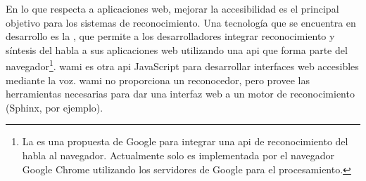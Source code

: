 En lo que respecta a aplicaciones web, mejorar la accesibilidad es el principal objetivo para los sistemas
de reconocimiento. Una tecnolog\'ia que se encuentra en desarrollo es la  \cite{GoogleWebSpeechAPI}, 
que permite a los desarrolladores integrar reconocimiento y s\'intesis del habla a sus aplicaciones web utilizando
una \gls{api} que forma parte del navegador\footnote{La  es una propuesta de Google para integrar
una \gls{api} de reconocimiento del habla al navegador. Actualmente solo es implementada por el navegador Google Chrome utilizando
los servidores de Google para el procesamiento.}. \gls{wami} \cite{GruensteinWami2008, WamiHome} es otra \gls{api} JavaScript
para desarrollar interfaces web accesibles mediante la voz. \gls{wami} no proporciona un reconocedor, pero provee
las herramientas necesarias para dar una interfaz web a un motor de reconocimiento (Sphinx, por ejemplo).